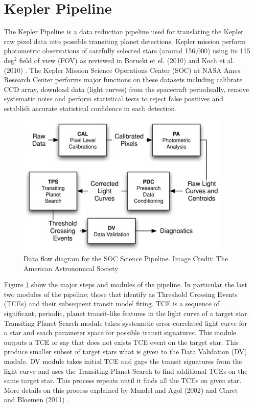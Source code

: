 \section{Kepler Pipeline}

The Kepler Pipeline \cite{2010ApJ...713L..87J} is a data reduction pipeline used for translating the Kepler raw pixel data into possible transiting planet detections. Kepler mission perform photometric observations of carefully selected stars (around 156,000) using its 115 deg$^2$ field of view (FOV) as reviewed in Borucki et el. (2010) \cite{Borucki977}
 and Koch et al. (2010)  \cite{2010ApJ...713L..79K}. The Kepler Mission Science Operations Center (SOC) at NASA Ames Research Center performs major functions on these datasets including calibrate CCD array, download data (light curves) from the spacecraft periodically, remove systematic noise \cite{2012PASP..124.1000S} and perform statistical tests to reject false positives and establish accurate statistical confidence in each detection.

\begin{figure}[!h]
\begin{center}
        \includegraphics[width=0.5\textheight]{img/kpipeline.jpg}
        \caption{Data flow diagram for the SOC Science Pipeline. Image Credit: The American Astronomical Society}  \label{fig:kpipleline}
\end{center}
\end{figure}

Figure \ref{fig:kpipleline} show the major steps and modules of the pipeline. In particular the last two modules of the pipeline; those that identify as Threshold Crossing Events (TCEs) and their subsequent transit model fiting. TCE is a sequence of significant, periodic, planet transit-like features in the light curve of a target star. Transiting Planet Search module takes systematic error-correlated light curve for a star and seach parameter space for possible transit signatures. This module outputs a TCE or say that does not exists TCE event on the target star. This produce smaller subset of target stars what is given to the Data Validation (DV) module. DV module takes initial TCE and gaps the transit signatures from the light curve and uses the Transiting Planet Search to find additional TCEs on the same target star. This process repeats until it finds all the TCEs on given star. More details on this process explained by Mandel and Agol (2002) \cite{2002ApJ...580L.171M} and Claret and Bloemen (2011) \cite{2011yCat..35290075C}.


